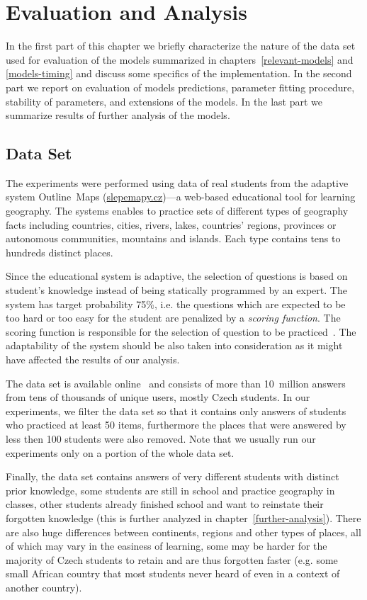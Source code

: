 \chapter{Evaluation and Analysis}
\label{analysis}

In the first part of this chapter we briefly characterize the nature of the data set used for evaluation of the models summarized in chapters~\ref{relevant-models} and \ref{models-timing} and discuss some specifics of the implementation. In the second part we report on evaluation of models predictions, parameter fitting procedure, stability of parameters, and extensions of the models. In the last part we summarize results of further analysis of the models.

\section{Data Set}
\label{data-set}

The experiments were performed using data of real students from the adaptive system Outline~Maps (\url{slepemapy.cz})---a web-based educational tool for learning geography. The systems enables to practice sets of different types of geography facts including countries, cities, rivers, lakes, countries' regions, provinces or autonomous communities, mountains and islands. Each type contains tens to hundreds distinct places.

Since the educational system is adaptive, the selection of questions is based on student's knowledge instead of being statically programmed by an expert. The system has target probability 75\%, i.e. the questions which are expected to be too hard or too easy for the student are penalized by a \textit{scoring function}. The scoring function is responsible for the selection of question to be practiced~\cite{Stanislav2015thesis}. The adaptability of the system should be also taken into consideration as it might have affected the results of our analysis.

The data set is available online~\cite{Papousek2015} and consists of more than 10~million answers from tens of thousands of unique users, mostly Czech students. In our experiments, we filter the data set so that it contains only answers of students who practiced at least 50 items, furthermore the places that were answered by less then 100 students were also removed. Note that we usually run our experiments only on a portion of the whole data set.

Finally, the data set contains answers of very different students with distinct prior knowledge, some students are still in school and practice geography in classes, other students already finished school and want to reinstate their forgotten knowledge (this is further analyzed in chapter~\ref{further-analysis}). There are also huge differences between continents, regions and other types of places, all of which may vary in the easiness of learning, some may be harder for the majority of Czech students to retain and are thus forgotten faster (e.g. some small African country that most students never heard of even in a context of another country).

